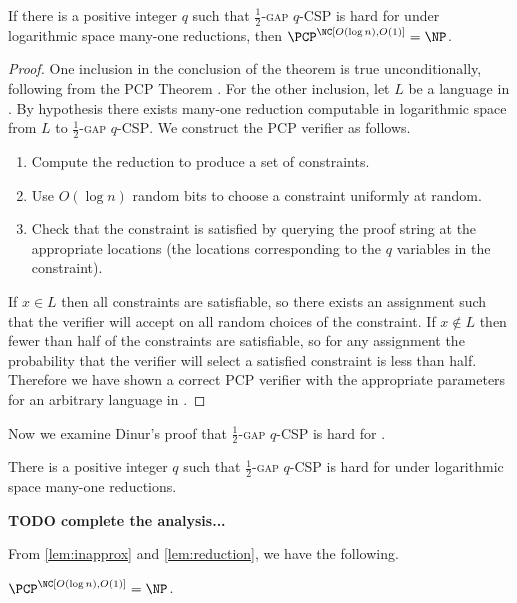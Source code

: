 \documentclass{article}
\begin{document}
\begin{lemma}\label{lem:inapprox}
  If there is a positive integer $q$ such that \textsc{$\frac{1}{2}$-gap $q$-CSP} is hard for \NP{} under logarithmic space many-one reductions, then $\PCP^\NC[O(\log n), O(1)] = \NP$.
\end{lemma}
\begin{proof}
  One inclusion in the conclusion of the theorem is true unconditionally, following from the PCP Theorem \cite{almss92}.
  For the other inclusion, let $L$ be a language in \NP.
  By hypothesis there exists many-one reduction computable in logarithmic space from $L$ to \textsc{$\frac{1}{2}$-gap $q$-CSP}.
  We construct the PCP verifier as follows.
  \begin{enumerate}
  \item Compute the reduction to produce a set of constraints.
  \item Use $O(\log n)$ random bits to choose a constraint uniformly at random.
  \item Check that the constraint is satisfied by querying the proof string at the appropriate locations (the locations corresponding to the $q$ variables in the constraint).
  \end{enumerate}

  If $x \in L$ then all constraints are satisfiable, so there exists an assignment such that the verifier will accept on all random choices of the constraint.
  If $x \notin L$ then fewer than half of the constraints are satisfiable, so for any assignment the probability that the verifier will select a satisfied constraint is less than half.
  Therefore we have shown a correct PCP verifier with the appropriate parameters for an arbitrary language in \NP.
\end{proof}

Now we examine Dinur's proof that \textsc{$\frac{1}{2}$-gap $q$-CSP} is hard for \NP.

\begin{lemma}\label{lem:reduction}
  There is a positive integer $q$ such that \textsc{$\frac{1}{2}$-gap $q$-CSP} is hard for \NP{} under logarithmic space many-one reductions.
\end{lemma}
\textbf{TODO complete the analysis...}

From \autoref{lem:inapprox} and \autoref{lem:reduction}, we have the following.

\begin{theorem}\label{thm:pcpnp}
  $\PCP^\NC[O(\log n), O(1)] = \NP$.
\end{theorem}
\end{document}
